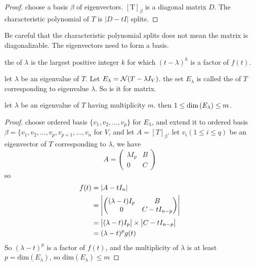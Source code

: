 \begin{proof}
    choose a basis $\beta$ of eigenvectors. $[\mathrm{T}]_\beta$ is a diagonal matrix $D$. The characteristic polynomial of $T$ is $|D - tI|$ splits.
\end{proof}

Be careful that the characteristic polynomial splits does not mean the matrix is diagonalizable. The eigenvectors need to form a basis.

\begin{definition}
    the  of $\lambda$ is the largest positive integer $k$ for which $(t - \lambda)^k$ is a factor of $f(t)$.
\end{definition}

\begin{definition}
    let $\lambda$ be an eigenvalue of $T$. Let $E_\lambda = \mathcal{N}(T - \lambda I_V)$. the set $E_\lambda$ is called the  of $T$ corresponding to eigenvalue $\lambda$. So is it for matrix.
\end{definition}

\begin{theorem}
    let $\lambda$ be an eigenvalue of $T$ having multiplicity $m$. then $1 \leq \displaystyle \text{dim}\left( E_\lambda \right) \leq m$.
\end{theorem}
\begin{proof}
    choose ordered basis $\{v_1, v_2, \dots, v_p\}$ for $E_\lambda$, and extend it to ordered basis $\beta = \{ v_1, v_2, \dots, v_p, v_{p+1}, \dots, v_n$ for $V$, and let $A = [T]_\beta$. let $v_i (1 \leq i \leq q)$ be an eigenvector of $T$ corresponding to $\lambda$, we have
    \begin{equation*}
        A = \begin{pmatrix}
            \lambda I_p & B \\
            0 & C
        \end{pmatrix}
    \end{equation*}
    so \begin{equation*}
        \begin{aligned}
            f(t) &= \displaystyle \left\lvert A - t I_n \right\rvert \\
            &= \displaystyle \left\lvert \begin{pmatrix}
                (\lambda - t) I_p & B \\
                0 & C - t I_{n-p}
            \end{pmatrix} \right\rvert \\
            &= \displaystyle \left\lvert (\lambda - t)I_p \right\rvert \times \displaystyle \left\lvert C - t I_{n-p} \right\rvert \\
            &= (\lambda - t)^p g(t)
        \end{aligned}
        \end{equation*}
    So $(\lambda - t)^p$ is a factor of $f(t)$, and the multiplicity of $\lambda$ is at least $p = \text{dim}(E_\lambda)$, so $\text{dim}(E_\lambda) \leq m$ 
\end{proof}

